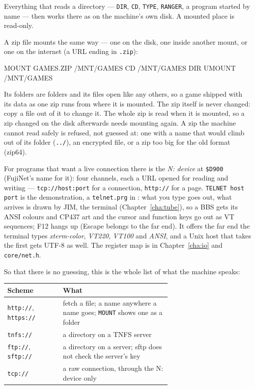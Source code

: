 \noindent Everything that reads a directory --- \verb|DIR|, \verb|CD|,
\verb|TYPE|, \verb|RANGER|, a program started by name --- then works
there as on the machine's own disk. A mounted place is read-only.

A zip file mounts the same way --- one on the disk, one inside another
mount, or one on the internet (a URL ending in \texttt{.zip}):

\begin{type}
MOUNT GAMES.ZIP /MNT/GAMES
CD /MNT/GAMES
DIR
UMOUNT /MNT/GAMES
\end{type}

\noindent Its folders are folders and its files open like any others, so
a game shipped with its data as one zip runs from where it is mounted. The
zip itself is never changed: copy a file out of it to change it. The whole
zip is read when it is mounted, so a zip changed on the disk afterwards
needs mounting again. A zip the machine cannot read safely is refused, not
guessed at: one with a name that would climb out of its folder
(\texttt{../}), an encrypted file, or a zip too big for the old format
(zip64).

For programs that want a live connection there is the \emph{N: device}
at \texttt{\$D900} (FujiNet's name for it): four channels, each a URL
opened for reading and writing --- \texttt{tcp://host:port} for a
connection, \texttt{http://} for a page. \verb|TELNET host port| is the
demonstration, a \texttt{telnet.prg} in : what you type
goes out, what arrives is drawn by JIM, the terminal
(Chapter~\ref{cha:tube}), so a BBS gets its ANSI colours and CP437 art
and the cursor and function keys go out as VT sequences; F12 hangs up
(Escape belongs to the far end). It offers the far end the terminal
types \emph{xterm-color}, \emph{VT220}, \emph{VT100} and \emph{ANSI}, and
a Unix host that takes the first gets UTF-8 as well. The register map is
in Chapter~\ref{cha:io} and \texttt{core/net.h}.

So that there is no guessing, this is the whole list of what the machine
speaks:

\begin{center}
\small
\begin{tabular}{@{}l >{\raggedright\arraybackslash}p{0.66\linewidth}@{}}
\toprule
\textbf{Scheme} & \textbf{What} \\
\midrule
\texttt{http://}, \texttt{https://} & fetch a file; a name anywhere a name goes; \verb|MOUNT| shows one as a folder \\
\texttt{tnfs://} & a directory on a TNFS server \\
\texttt{ftp://}, \texttt{sftp://} & a directory on a server; sftp does not check the server's key \\
\texttt{tcp://} & a raw connection, through the N: device only \\
\bottomrule
\end{tabular}
\end{center}

